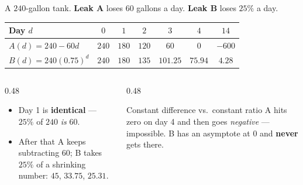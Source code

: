 \documentclass[aspectratio=169, 11pt]{beamer}
\begin{document}
\begin{frame}[t, plain]
  \begin{center}
    A $240$-gallon tank. \textbf{Leak A} loses $60$ gallons a day. \textbf{Leak B} loses $25\%$ a day.
  \end{center}
  \vspace{4pt}
  \begin{center}
  \footnotesize
  \renewcommand{\arraystretch}{1.35}
  \begin{tabular}{|l|c|c|c|c|c|c|}
  \hline
  Day $d$ & $0$ & $1$ & $2$ & $3$ & $4$ & $14$ \\ \hline
  $A(d)=240-60d$ & $240$ & $180$ & $120$ & $60$ & $0$ & $-600$ \\ \hline
  $B(d)=240(0.75)^{d}$ & $240$ & $180$ & $135$ & $101.25$ & $75.94$ & $4.28$ \\ \hline
  \end{tabular}
  \end{center}
  \vspace{6pt}
  \begin{columns}[T]
    \begin{column}{0.48\textwidth}
      \footnotesize
      \begin{itemize}\setlength{\itemsep}{3pt}
        \item Day 1 is \textbf{identical} --- $25\%$ of $240$ \emph{is} $60$.
        \item After that A keeps subtracting $60$; B takes $25\%$ of a shrinking number: $45$, $33.75$, $25.31$.
      \end{itemize}
    \end{column}
    \begin{column}{0.48\textwidth}
      \begin{block}{Constant difference vs.\ constant ratio}
        A hits zero on day 4 and then goes \emph{negative} --- impossible. B has an asymptote at $0$
        and \textbf{never} gets there.
      \end{block}
    \end{column}
  \end{columns}
\end{frame}
\end{document}
